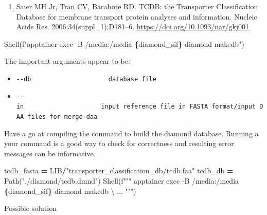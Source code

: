\documentclass[
]{book}
\newenvironment{Shaded}{\begin{snugshade}}{\end{snugshade}}
\newcommand{\CharTok}[1]{\textcolor[rgb]{0.31,0.60,0.02}{#1}}
\newcommand{\NormalTok}[1]{#1}
\newcommand{\OperatorTok}[1]{\textcolor[rgb]{0.81,0.36,0.00}{\textbf{#1}}}
\newcommand{\SpecialCharTok}[1]{\textcolor[rgb]{0.81,0.36,0.00}{\textbf{#1}}}
\newcommand{\SpecialStringTok}[1]{\textcolor[rgb]{0.31,0.60,0.02}{#1}}
\newcommand{\StringTok}[1]{\textcolor[rgb]{0.31,0.60,0.02}{#1}}
\providecommand{\tightlist}{%
  \setlength{\itemsep}{0pt}\setlength{\parskip}{0pt}}
\begin{document}
\begin{enumerate}
\def\labelenumi{\arabic{enumi}.}
\tightlist
\item
  Saier MH Jr, Tran CV, Barabote RD. TCDB: the Transporter Classification Database for membrane transport protein analyses and information. Nucleic Acids Res. 2006;34(suppl\_1):D181--6. \url{https://doi.org/10.1093/nar/gkj001}
\end{enumerate}

\begin{Shaded}
\begin{Highlighting}[numbers=left,,]
\NormalTok{Shell(}\SpecialStringTok{f"apptainer exec {-}B /media:/media }\SpecialCharTok{\{}\NormalTok{diamond\_sif}\SpecialCharTok{\}}\SpecialStringTok{ diamond makedb"}\NormalTok{)}
\end{Highlighting}
\end{Shaded}

The important arguments appear to be:

\begin{itemize}
\tightlist
\item
  \texttt{-\/-db\ \ \ \ \ \ \ \ \ \ \ \ \ \ \ \ \ \ \ \ \ database\ file}
\item
  \texttt{-\/-in\ \ \ \ \ \ \ \ \ \ \ \ \ \ \ \ \ \ \ \ \ input\ reference\ file\ in\ FASTA\ format/input\ DAA\ files\ for\ merge-daa}
\end{itemize}

Have a go at compiling the command to build the diamond database.
Running a your command is a good way to check for correctness and resulting error messages can be informative.

\begin{Shaded}
\begin{Highlighting}[numbers=left,,]
\NormalTok{tcdb\_fasta }\OperatorTok{=}\NormalTok{ LIB}\OperatorTok{/}\StringTok{"transporter\_classification\_db/tcdb.faa"}
\NormalTok{tcdb\_db }\OperatorTok{=}\NormalTok{ Path(}\StringTok{"./diamond/tcdb.dmnd"}\NormalTok{)}
\NormalTok{Shell(}\SpecialStringTok{f"""}
\SpecialStringTok{apptainer exec {-}B /media:/media }\SpecialCharTok{\{}\NormalTok{diamond\_sif}\SpecialCharTok{\}}\SpecialStringTok{ diamond makedb }\CharTok{\textbackslash{}}
\SpecialStringTok{    ...}
\SpecialStringTok{"""}\NormalTok{)}
\end{Highlighting}
\end{Shaded}

Possible solution
\end{document}
